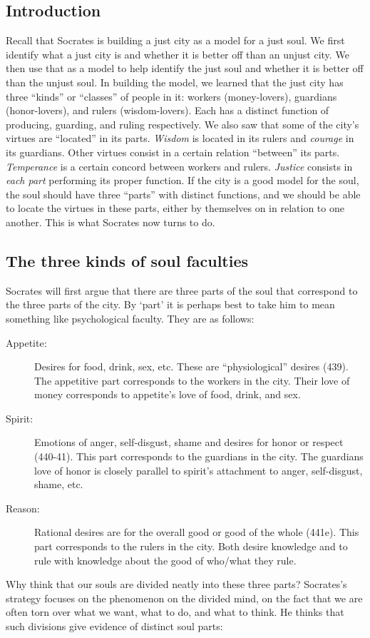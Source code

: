 \documentclass[oneside]{article}
\begin{document}
\thispagestyle{fancy}

\subsection*{Introduction}

Recall that Socrates is building a just city as a model for a just soul. We first identify what a just city is and whether it is better off than an unjust city. We then use that as a model to help identify the just soul and whether it is better off than the unjust soul.  In building the model, we learned that the just city has three ``kinds'' or ``classes'' of people in it: workers (money-lovers), guardians (honor-lovers), and rulers (wisdom-lovers). Each has a distinct function of producing, guarding, and ruling respectively. We also saw that some of the city's virtues are ``located'' in its parts. \emph{Wisdom} is located in its rulers and \emph{courage} in its guardians. Other virtues consist in a certain relation ``between'' its parts.  \emph{Temperance} is a certain concord between workers and rulers. \emph{Justice} consists in \emph{each part }performing its proper function. If the city is a good model for the soul, the soul should have three ``parts'' with distinct functions, and we should be able to locate the virtues in these parts, either by themselves on in relation to one another. This is what Socrates now turns to do. 


\subsection*{The three kinds of soul faculties}
Socrates will first argue that there are three parts of the soul that correspond to the three parts of the city. By `part' it is perhaps best to take him to mean something like psychological faculty. They are as follows:  
\begin{description}
\item[Appetite:] Desires for food, drink, sex, etc. These are ``physiological'' desires (439). The appetitive part corresponds to the workers in the city. Their love of money corresponds to appetite's love of food, drink, and sex. 
\item[Spirit:] Emotions of anger, self-disgust, shame and desires for honor or respect (440-41). This part corresponds to the guardians in the city. The guardians love of honor is closely parallel to spirit's attachment to anger, self-disgust, shame, etc. 
\item[Reason:] Rational desires are for the overall good or good of the whole (441e). This part corresponds to the rulers in the city. Both desire knowledge and to rule with knowledge about the good of who/what they rule. 
\end{description}
Why think that our souls are divided neatly into these three parts? Socrates's strategy focuses on the phenomenon on the divided mind, on the fact that we are often torn over what we want, what to do, and what to think. He thinks that such divisions give evidence of distinct soul parts: 
\end{document}
